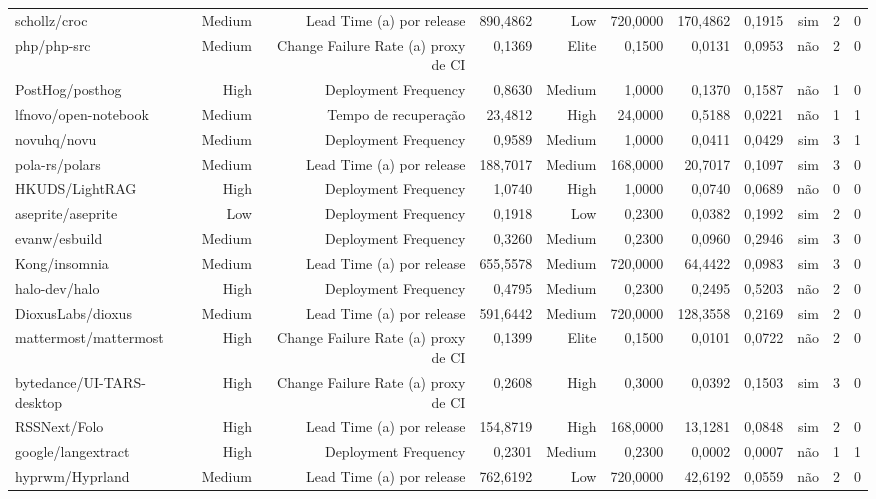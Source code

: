 \begin{tabular}{lrrrrrrrrrr}
schollz/croc & Medium & Lead Time (a) por release & 890,4862 & Low & 720,0000 & 170,4862 & 0,1915 & sim & 2 & 0 \\
php/php-src & Medium & Change Failure Rate (a) proxy de CI & 0,1369 & Elite & 0,1500 & 0,0131 & 0,0953 & não & 2 & 0 \\
PostHog/posthog & High & Deployment Frequency & 0,8630 & Medium & 1,0000 & 0,1370 & 0,1587 & não & 1 & 0 \\
lfnovo/open-notebook & Medium & Tempo de recuperação & 23,4812 & High & 24,0000 & 0,5188 & 0,0221 & não & 1 & 1 \\
novuhq/novu & Medium & Deployment Frequency & 0,9589 & Medium & 1,0000 & 0,0411 & 0,0429 & sim & 3 & 1 \\
pola-rs/polars & Medium & Lead Time (a) por release & 188,7017 & Medium & 168,0000 & 20,7017 & 0,1097 & sim & 3 & 0 \\
HKUDS/LightRAG & High & Deployment Frequency & 1,0740 & High & 1,0000 & 0,0740 & 0,0689 & não & 0 & 0 \\
aseprite/aseprite & Low & Deployment Frequency & 0,1918 & Low & 0,2300 & 0,0382 & 0,1992 & sim & 2 & 0 \\
evanw/esbuild & Medium & Deployment Frequency & 0,3260 & Medium & 0,2300 & 0,0960 & 0,2946 & sim & 3 & 0 \\
Kong/insomnia & Medium & Lead Time (a) por release & 655,5578 & Medium & 720,0000 & 64,4422 & 0,0983 & sim & 3 & 0 \\
halo-dev/halo & High & Deployment Frequency & 0,4795 & Medium & 0,2300 & 0,2495 & 0,5203 & não & 2 & 0 \\
DioxusLabs/dioxus & Medium & Lead Time (a) por release & 591,6442 & Medium & 720,0000 & 128,3558 & 0,2169 & sim & 2 & 0 \\
mattermost/mattermost & High & Change Failure Rate (a) proxy de CI & 0,1399 & Elite & 0,1500 & 0,0101 & 0,0722 & não & 2 & 0 \\
bytedance/UI-TARS-desktop & High & Change Failure Rate (a) proxy de CI & 0,2608 & High & 0,3000 & 0,0392 & 0,1503 & sim & 3 & 0 \\
RSSNext/Folo & High & Lead Time (a) por release & 154,8719 & High & 168,0000 & 13,1281 & 0,0848 & sim & 2 & 0 \\
google/langextract & High & Deployment Frequency & 0,2301 & Medium & 0,2300 & 0,0002 & 0,0007 & não & 1 & 1 \\
hyprwm/Hyprland & Medium & Lead Time (a) por release & 762,6192 & Low & 720,0000 & 42,6192 & 0,0559 & não & 2 & 0 \\

\end{tabular}
